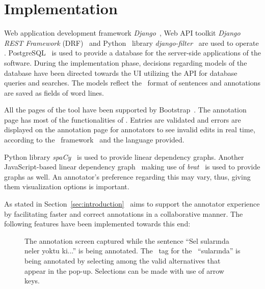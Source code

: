 \section{Implementation}
\label{sec:implementation}

Web application development framework \textit{Django}~\cite{django}, Web API toolkit \textit{Django REST Framework} (DRF)~\cite{drf} and Python~\cite{python} library \textit{django-filter}~\cite{django-filter} are used to operate \boatvtwo.
PostgreSQL~\cite{psql} is used to provide a database for the server-side applications of the software.
During the implementation phase, decisions regarding models of the database have been directed towards the UI utilizing the API for database queries and searches.
The models reflect the \ud\ format of sentences and annotations are saved as fields of word lines.

All the pages of the tool have been supported by Bootstrap~\cite{bootstrap}.
The annotation page has most of the functionalities of \boatvone.
Entries are validated and errors are displayed on the annotation page for annotators to see invalid edits in real time, according to the \ud\ framework~\cite{UD} and the language provided.

Python library \textit{spa\textsc{C}y}~\cite{spacy} is used to provide linear dependency graphs.
Another JavaScript-based linear dependency graph~\cite{spyssalo} making use of \textit{brat}~\cite{brat} is used to provide graphs as well.
An annotator's preference regarding this may vary, thus, giving them visualization options is important.

As stated in Section~\ref{sec:introduction} \boatvtwo\ aims to support the annotator experience by facilitating faster and correct annotations in a collaborative manner. The following features have been implemented towards this end:

\begin{figure}[tbh]
    \centering
    \caption{The annotation screen captured while the sentence ``Sel sularında neler yoktu ki...'' is being annotated. The \deprel\ tag for the \form\ ``sularında'' is being annotated by selecting among the valid alternatives that appear in the pop-up. Selections can be made with use of arrow keys.}
    \label{fig:anno-fig}
\end{figure}


